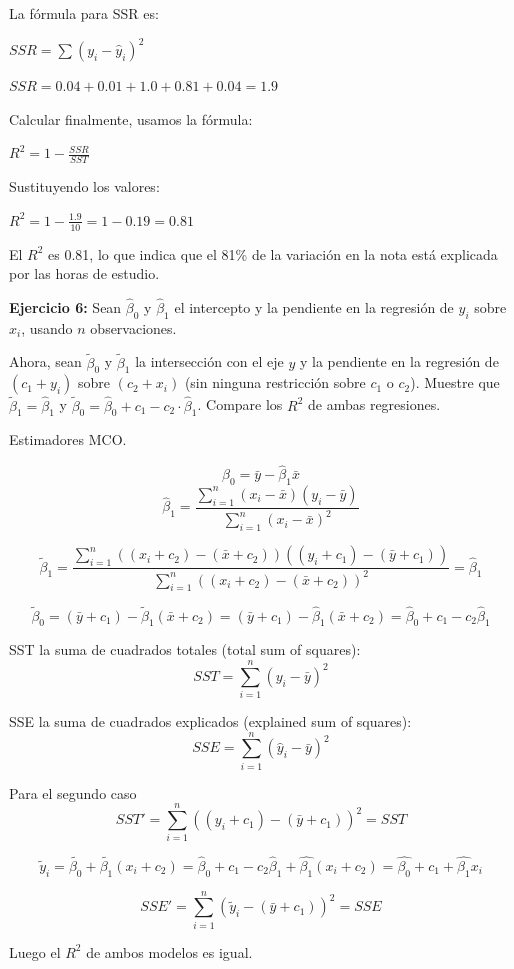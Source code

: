 \documentclass[10pt,a4paper]{article}
\begin{document}
\begin{enumerate}
{La fórmula para SSR es:

$SSR = \sum (y_i - \hat{y}_i)^2$

$SSR = 0.04 + 0.01 + 1.0 + 0.81 + 0.04 = 1.9$

 Calcular  finalmente, usamos la fórmula:

$R^2 = 1 - \frac{SSR}{SST}$

Sustituyendo los valores:

$R^2 = 1 - \frac{1.9}{10} = 1 - 0.19 = 0.81$



El $R^2$ es 0.81, lo que indica que el 81\% de la variación en la nota está explicada por las horas de estudio.

}
\end{enumerate}

{\bf Ejercicio 6:} Sean \(\hat{\beta}_0\) y \(\hat{\beta}_1\) el intercepto y la pendiente en la regresión de \(y_i\) sobre \(x_i\), usando \(n\) observaciones.

Ahora, sean \(\tilde{\beta}_0\) y \(\tilde{\beta}_1\) la intersección con el eje \(y\) y la pendiente en la regresión de \((c_1 + y_i)\) sobre \((c_2 + x_i)\) (sin ninguna restricción sobre \(c_1\) o \(c_2\)). Muestre que \(\tilde{\beta}_1 = \hat{\beta}_1\) y \(\tilde{\beta}_0 = \hat{\beta}_0 +c_1- c_2 \cdot \hat{\beta}_1\). Compare los $R^2$ de ambas regresiones.

{\color{red} Estimadores MCO.

$$\hat{\beta}_0 = \bar{y} - \hat{\beta}_1 \bar{x} $$
$$\hat{\beta}_1 = \frac{\sum_{i=1}^{n}(x_i - \bar{x})(y_i-\bar{y})}{\sum_{i=1}^{n}(x_i - \bar{x})^2}$$


$$\tilde{\beta}_1 = \frac{\sum_{i=1}^{n}((x_i+c_2) - (\bar{x}+c_2))((y_i+c_1)-(\bar{y}+c_1))}{\sum_{i=1}^{n}((x_i+c_2) - (\bar{x}+c_2))^2}=\hat{\beta}_1$$

$$\tilde{\beta}_0 = (\bar{y}+c_1) - \tilde{\beta}_1 (\bar{x}+c_2)= (\bar{y}+c_1) - \hat{\beta}_1 (\bar{x}+c_2)=\hat{\beta}_0+c_1-c_2\hat{\beta}_1  $$
}



    
{\color{red} SST la suma de cuadrados totales (total sum of squares):
		\[ SST = \sum_{i=1}^{n} (y_i - \bar{y})^2 \]
		
	 SSE la suma de cuadrados explicados (explained sum of squares):
	{\color{red}	\[ SSE = \sum_{i=1}^{n} (\hat{y}_i - \bar{y})^2 \]}	

 Para el segundo caso
		\[ SST' = \sum_{i=1}^{n} ((y_i+c_1) - (\bar{y}+c_1))^2 =SST\]
		
		
$$\tilde{y}_i=\tilde{\beta_0}+\tilde{\beta_1}(x_i+c_2)=\hat{\beta}_0+c_1-c_2\hat{\beta}_1 + \hat{\beta_1}(x_i+c_2)= \hat{\beta_0}+c_1+\hat{\beta_1}x_i$$
	{\color{red}	\[ SSE' = \sum_{i=1}^{n} (\tilde{y}_i - (\bar{y}+c_1))^2=SSE \]
 
 Luego el $R^2$ de ambos modelos es igual. 
 }		
  
 }
\end{document}
